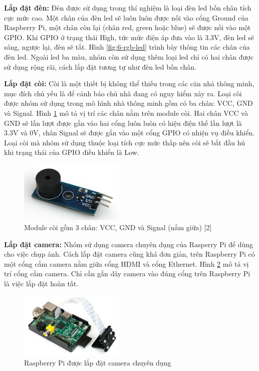 \documentclass[12pt,a4paper,oneside]{extbook}
\begin{document}
\textbf{Lắp đặt đèn:} Đèn được sử dụng trong thí nghiệm là loại đèn led bốn chân tích cực mức cao. Một chân của đèn led sẽ luôn luôn được nối vào cổng Ground của Raspberry Pi, một chân còn lại (chân red, green hoặc blue) sẽ được nối vào một GPIO. Khi GPIO ở trạng thái High, tức mức điện áp đưa vào là 3.3V, đèn led sẽ sáng, ngược lại, đèn sẽ tắt. Hình \ref{fig:6-rgb-led} trình bày thông tin các chân của đèn led. Ngoài led ba màu, nhóm còn sử dụng thêm loại led chỉ có hai chân được sử dụng rộng rãi, cách lắp đặt tương tự như đèn led bốn chân.

\textbf{Lắp đặt còi:} Còi là một thiết bị không thể thiếu trong các căn nhà thông minh, mục đích chủ yếu là để cảnh báo chủ nhà đang có nguy hiểm xảy ra. Loại còi được nhóm sử dụng trong mô hình nhà thông minh gồm có ba chân: VCC, GND và Signal. Hình \ref{fig:6-buzzer} mô tả vị trí các chân nằm trên module còi. Hai chân VCC và GND sẽ lần lượt được gắn vào hai cổng luôn luôn có hiệu điện thế lần lượt là 3.3V và 0V, chân Signal sẽ được gắn vào một cổng GPIO có nhiện vụ điều khiển. Loại còi mà nhóm sử dụng thuộc loại tích cực mức thấp nên còi sẽ bắt đầu hú khi trạng thái của GPIO điều khiển là Low.

\begin{figure}[h]
  \centering
     \includegraphics[width=5cm]{6-buzzer}
  \caption{Module còi gồm 3 chân: VCC, GND và Signal (nằm giữa) [2]}\label{fig:6-buzzer}
\end{figure}

\textbf{Lắp đặt camera:} Nhóm sử dụng camera chuyên dụng của Rasperry Pi để dùng cho việc chụp ảnh. Cách lắp đặt camera cũng khá đơn giản, trên Raspberry Pi có một cổng cắm camera nằm giữa cổng HDMI và cổng Ethernet. Hình \ref{fig:6-camera} mô tả vị trí cổng cắm camera. Chỉ cần gắn dây camera vào đúng cổng trên Raspberry Pi là việc lắp đặt hoàn tất.

\begin{figure}[h]
  \centering
     \includegraphics[width=5cm]{6-camera}
  \caption{Raspberry Pi được lắp đặt camera chuyên dụng}\label{fig:6-camera}
\end{figure}
\end{document}

